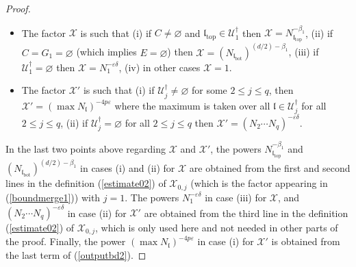 \documentclass[11 pt,reqno]{amsart}
\theoremstyle{definition}
\theoremstyle{remark}
\numberwithin{equation}{section}
\newcommand{\Uc}{\mathcal{U}}
\newcommand{\Xc}{\mathcal{X}}
\newcommand{\lf}{\mathfrak{l}}
\begin{document}
{\begin{proof}
\begin{itemize}
\item The factor $\Xc$ is such that (i) if $C\neq\varnothing$ and $\lf_{\mathrm{top}}\in\Uc_1^\dagger$ then $\Xc=N_{\lf_{\mathrm{top}}}^{-\beta_1}$, (ii) if $C=G_1=\varnothing$ (which implies $E=\varnothing$) then $\Xc=(N_{\lf_{\mathrm{bot}}})^{(d/2)-\beta_1}$, (iii) if $\Uc_1^\dagger=\varnothing$ then $\Xc=N_1^{-\varepsilon\delta}$, (iv) in other cases $\Xc=1$.
\item The factor $\Xc'$ is such that (i) if $\Uc_j^\dagger\neq\varnothing$ for some $2\leq j\leq q$, then $\Xc'=(\max N_\lf)^{-4p\varepsilon}$ where the maximum is taken over all $\lf\in\Uc_j^\dagger$ for all $2\leq j\leq q$, (ii) if $\Uc_j^\dagger=\varnothing$ for all $2\leq j\leq q$ then $\Xc'=(N_2\cdots N_q)^{-\varepsilon\delta}$.
\end{itemize}
In the last two points above regarding $\Xc$ and $\Xc'$, the powers $N_{\lf_{\mathrm{top}}}^{-\beta_1}$ and $(N_{\lf_{\mathrm{bot}}})^{(d/2)-\beta_1}$ in cases (i) and (ii) for $\Xc$ are obtained from the first and second lines in the definition (\ref{estimate02}) of $\Xc_{0,j}$ (which is the factor appearing in (\ref{boundmerge1})) with $j=1$. 
The powers $N_1^{-\varepsilon\delta}$ in case (iii) for $\Xc$, and $(N_2\cdots N_q)^{-\varepsilon\delta}$ in case (ii) for $\Xc'$ are obtained from the third line in the definition (\ref{estimate02}) of $\Xc_{0,j}$, which is only used here and not needed in other parts of the proof. 
Finally, the power $(\max N_\lf)^{-4p\varepsilon}$ in case (i) for $\Xc'$ is obtained from the last term of (\ref{outputbd2}).


\end{proof}}
\end{document}
